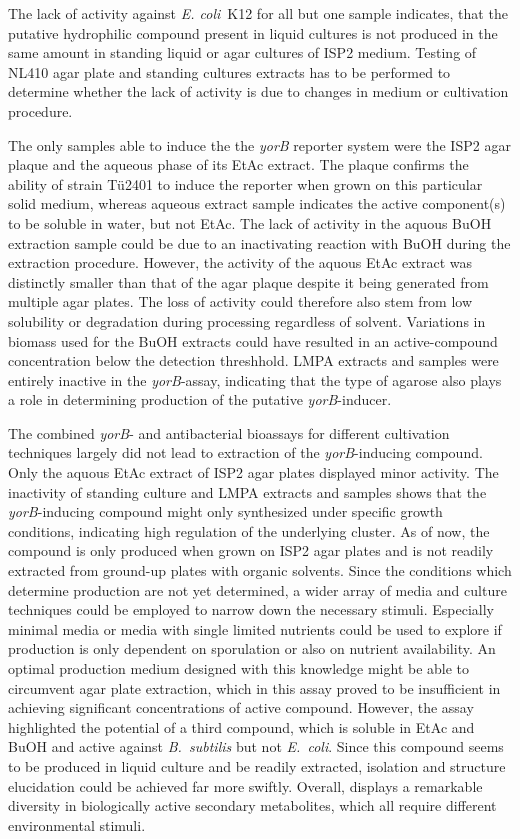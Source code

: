 The lack of activity against \emph{E. coli}~K12 for all but one sample indicates, that the putative hydrophilic compound present in liquid cultures is not produced in the same amount in standing liquid or agar cultures of ISP2 medium.
Testing of NL410 agar plate and standing cultures extracts has to be performed to determine whether the lack of activity is due to changes in medium or cultivation procedure.

The only samples able to induce the the \emph{yorB} reporter system were the ISP2 agar plaque and the aqueous phase of its EtAc extract.
The plaque confirms the ability of strain Tü2401 to induce the reporter when grown on this particular solid medium, whereas aqueous extract sample indicates the active component(s) to be soluble in water, but not EtAc.
The lack of activity in the aquous BuOH extraction sample could be due to an inactivating reaction with BuOH during the extraction procedure.
However, the activity of the aquous EtAc extract was distinctly smaller than that of the agar plaque despite it being generated from multiple agar plates.
The loss of activity could therefore also stem from low solubility or degradation during processing regardless of solvent.
Variations in biomass used for the BuOH extracts could have resulted in an active-compound concentration below the detection threshhold.
LMPA extracts and samples were entirely inactive in the \emph{yorB}-assay, indicating that the type of agarose also plays a role in determining production of the putative \emph{yorB}-inducer.

The combined \emph{yorB}- and antibacterial bioassays for different cultivation techniques largely did not lead to extraction of the \emph{yorB}-inducing compound.
Only the aquous EtAc extract of ISP2 agar plates displayed minor activity.
The inactivity of standing culture and LMPA extracts and samples shows that the \emph{yorB}-inducing compound might only synthesized under specific growth conditions, indicating high regulation of the underlying cluster.
As of now, the compound is only produced when grown on ISP2 agar plates and is not readily extracted from ground-up plates with organic solvents.
Since the conditions which determine production are not yet determined, a wider array of media and culture techniques could be employed to narrow down the necessary stimuli.
Especially minimal media or media with single limited nutrients could be used to explore if production is only dependent on sporulation or also on nutrient availability.
An optimal production medium designed with this knowledge might be able to circumvent agar plate extraction, which in this assay proved to be insufficient in achieving significant concentrations of active compound.
However, the assay highlighted the potential of a third compound, which is soluble in EtAc and BuOH and active against \emph{B.~subtilis} but not \emph{E.~coli}.
Since this compound seems to be produced in liquid culture and be readily extracted, isolation and structure elucidation could be achieved far more swiftly.
Overall, \tue{} displays a remarkable diversity in biologically active secondary metabolites, which all require different environmental stimuli.

